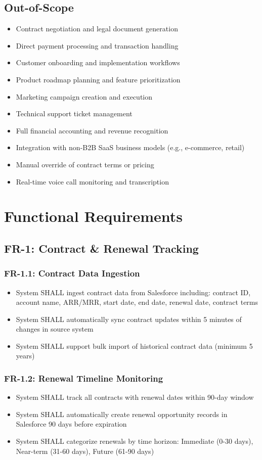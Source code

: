 \documentclass[12pt,a4paper]{article}
\begin{document}
\subsection{Out-of-Scope}
\begin{itemize}
    \item Contract negotiation and legal document generation
    \item Direct payment processing and transaction handling
    \item Customer onboarding and implementation workflows
    \item Product roadmap planning and feature prioritization
    \item Marketing campaign creation and execution
    \item Technical support ticket management
    \item Full financial accounting and revenue recognition
    \item Integration with non-B2B SaaS business models (e.g., e-commerce, retail)
    \item Manual override of contract terms or pricing
    \item Real-time voice call monitoring and transcription
\end{itemize}

\section{Functional Requirements}

\subsection{FR-1: Contract \& Renewal Tracking}
\subsubsection{FR-1.1: Contract Data Ingestion}
\begin{itemize}
    \item System SHALL ingest contract data from Salesforce including: contract ID, account name, ARR/MRR, start date, end date, renewal date, contract terms
    \item System SHALL automatically sync contract updates within 5 minutes of changes in source system
    \item System SHALL support bulk import of historical contract data (minimum 5 years)
\end{itemize}
\subsubsection{FR-1.2: Renewal Timeline Monitoring}
\begin{itemize}
    \item System SHALL track all contracts with renewal dates within 90-day window
    \item System SHALL automatically create renewal opportunity records in Salesforce 90 days before expiration
    \item System SHALL categorize renewals by time horizon: Immediate (0-30 days), Near-term (31-60 days), Future (61-90 days)
\end{itemize}
\end{document}
